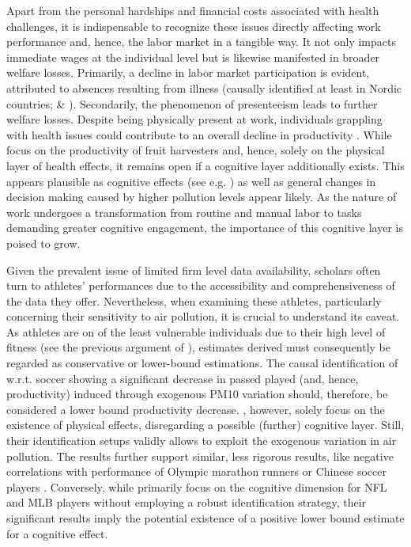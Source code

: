 \documentclass[12pt,a4paper]{article}
\begin{document}
Apart from the personal hardships and financial costs associated with health challenges, it is indispensable to recognize these issues directly affecting work performance and, hence, the labor market in a tangible way. It not only impacts immediate wages at the individual level but is likewise manifested in broader welfare losses. Primarily, a decline in labor market participation is evident, attributed to absences resulting from illness (causally identified at least in Nordic countries; \citealp{hansen2000} \& \citealp{jans2018}). Secondarily, the phenomenon of presenteeism leads to further welfare losses. Despite being physically present at work, individuals grappling with health issues could contribute to an overall decline in productivity \citep{zivin2012}. While \citet{zivin2012} focus on the productivity of fruit harvesters and, hence, solely on the physical layer of health effects, it remains open if a cognitive layer additionally exists. This appears plausible as cognitive effects (see e.g. \citealp{schikowski2015,tonne2014,ranft2009}) as well as general changes in decision making \citep{archsmith2018} caused by higher pollution levels appear likely. As the nature of work undergoes a transformation from routine and manual labor to tasks demanding greater cognitive engagement, the importance of this cognitive layer
is poised to grow.

Given the prevalent issue of limited firm level data availability, scholars often turn to athletes' performances due to the accessibility and comprehensiveness of the data they offer. Nevertheless, when examining these athletes, particularly concerning their sensitivity to air pollution, it is crucial to understand its caveat. As athletes are on of the least vulnerable individuals due to their high level of fitness (see the previous argument of \citealp{peled2011}),  estimates derived must consequently be regarded as conservative or lower-bound estimations. The causal identification of \citet{lichter2017} w.r.t. soccer showing a significant decrease in passed played (and, hence, productivity) induced through exogenous PM10 variation should, therefore, be considered a lower bound productivity decrease. \citet{lichter2017}, however, solely focus on the existence of physical effects, disregarding a possible (further) cognitive layer. Still, their identification setups validly allows to exploit the exogenous variation in air pollution. The results further support similar, less  rigorous results, like negative correlations with performance of Olympic marathon runners \citep{marr2010} or Chinese soccer players \citep{qin2022}. Conversely, while \citet{heintz2022} primarily focus on the cognitive dimension for NFL and MLB players without employing a robust identification strategy, their significant results imply the potential existence of a positive lower bound estimate for a cognitive effect. 
\end{document}
